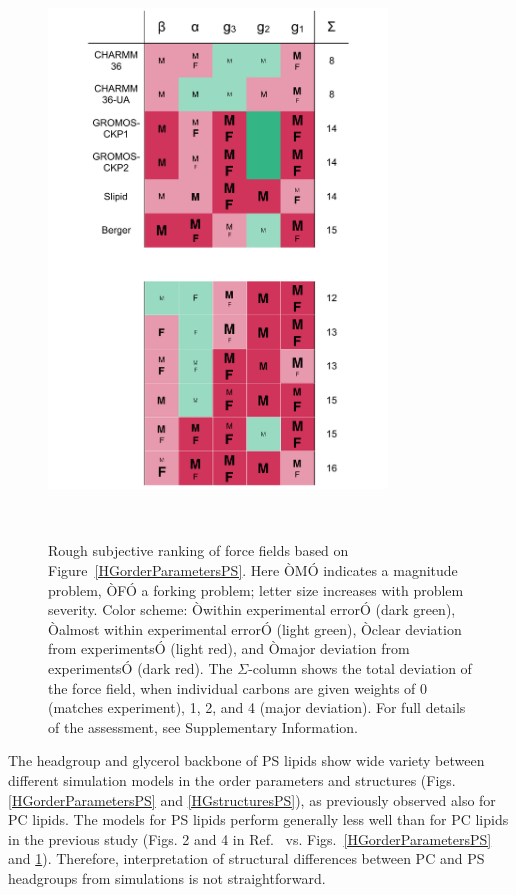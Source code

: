 \documentclass[aps,prl,superscriptaddress,twocolumn]{revtex4}
\begin{document}
\begin{figure}[]
  \centering
  \includegraphics[width=9.0cm]{../Figs/comparisonTablePS.pdf}
  \caption{\label{comparisonTablePS}
  Rough subjective ranking of force fields based on Figure~\ref{HGorderParametersPS}. Here ÒMÓ indicates a magnitude problem, ÒFÓ a forking problem; letter size increases with problem severity. Color scheme: Òwithin experimental errorÓ (dark green), Òalmost within experimental errorÓ (light green), Òclear deviation from experimentsÓ (light red), and Òmajor deviation from experimentsÓ (dark red). The $\Sigma$-column shows the total deviation of the force field, when individual carbons are given weights of 0 (matches experiment), 1, 2, and 4 (major deviation). For full details of the assessment, see Supplementary Information.
  }
   \\
\end{figure}

The headgroup and glycerol backbone of PS lipids show wide variety between different simulation
models in the order parameters and structures (Figs. \ref{HGorderParametersPS} and \ref{HGstructuresPS}),
as previously observed also for PC lipids. The models for PS lipids perform generally less well than for
PC lipids in the previous study
(Figs. 2 and 4 in Ref.~\cite{botan15} vs. Figs.~\ref{HGorderParametersPS} and \ref{comparisonTablePS}).
Therefore, interpretation of structural differences between PC and PS headgroups
from simulations is not straightforward.
\end{document}
